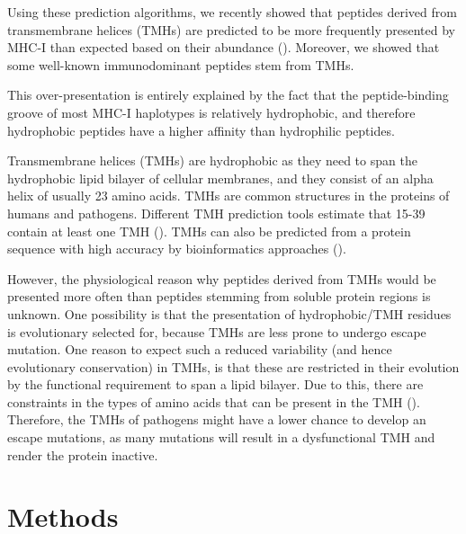 Using these prediction algorithms, 
we recently showed that peptides derived 
from transmembrane helices (TMHs) 
are predicted to be more frequently presented by MHC-I 
than expected based on their abundance (\cite{bianchi2017}). 
Moreover, we showed that some well-known immunodominant peptides stem from TMHs. 

This over-presentation is entirely explained by the fact 
that the peptide-binding groove of most MHC-I haplotypes 
is relatively hydrophobic, 
and therefore hydrophobic peptides have a higher affinity 
than hydrophilic peptides. 

Transmembrane helices (TMHs) are hydrophobic 
as they need to span the hydrophobic lipid bilayer of cellular membranes, 
and they consist of an alpha helix of usually 23 amino acids. 
TMHs are common structures in the proteins of humans and pathogens. 
Different TMH prediction tools estimate
that 15-39%
contain at least one TMH (\cite{ahram2006estimation}). 
TMHs can also be predicted from a protein sequence 
with high accuracy by bioinformatics approaches (\cite{krogh2001predicting,bianchi2017,kall2004combined,arai2004conpred,jones2007improving,klammer2009metatm,wang2019efficient}).

However, the physiological reason why peptides derived from TMHs 
would be presented more often than peptides 
stemming from soluble protein regions is unknown. 
One possibility is that the presentation of 
hydrophobic/TMH residues is evolutionary selected for, 
because TMHs are less prone to undergo escape mutation. 
One reason to expect such a reduced 
variability (and hence evolutionary conservation) in TMHs, 
is that these are restricted in their evolution 
by the functional requirement to span a lipid bilayer. 
Due to this, there are constraints in the types of amino acids 
that can be present in the TMH (\cite{jones1994model}). 
Therefore, the TMHs of pathogens 
might have a lower chance to develop an escape mutations, 
as many mutations will result in a dysfunctional TMH 
and render the protein inactive.


\section{Methods}

